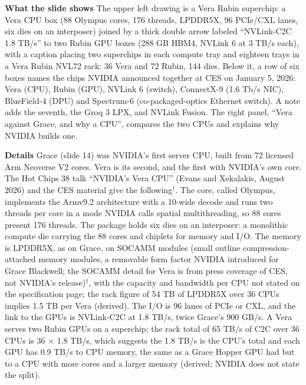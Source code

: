 \documentclass[11pt,letterpaper]{article}
\newcommand{\para}[1]{\medskip\noindent\textbf{#1}\quad}
\begin{document}
\para{What the slide shows} The upper left drawing is a Vera Rubin superchip: a Vera CPU box (88 Olympus cores, 176 threads, LPDDR5X, 96 PCIe/CXL lanes, six dies on an interposer) joined by a thick double arrow labeled ``NVLink-C2C 1.8 TB/s'' to two Rubin GPU boxes (288 GB HBM4, NVLink 6 at 3 TB/s each), with a caption placing two superchips in each compute tray and eighteen trays in a Vera Rubin NVL72 rack: 36 Vera and 72 Rubin, 144 dies. Below it, a row of six boxes names the chips NVIDIA announced together at CES on January 5, 2026: Vera (CPU), Rubin (GPU), NVLink 6 (switch), ConnectX-9 (1.6 Tb/s NIC), BlueField-4 (DPU) and Spectrum-6 (co-packaged-optics Ethernet switch). A note adds the seventh, the Groq 3 LPX, and NVLink Fusion. The right panel, ``Vera against Grace, and why a CPU'', compares the two CPUs and explains why NVIDIA builds one.

\para{Details} Grace (slide 14) was NVIDIA's first server CPU, built from 72 licensed Arm Neoverse V2 cores. Vera is its second, and the first with NVIDIA's own core. The Hot Chips 38 talk ``NVIDIA's Vera CPU'' (Evans and Xekalakis, August 2026) and the CES material give the following$^\dagger$. The core, called Olympus, implements the Armv9.2 architecture with a 10-wide decode and runs two threads per core in a mode NVIDIA calls spatial multithreading, so 88 cores present 176 threads. The package holds six dies on an interposer: a monolithic compute die carrying the 88 cores and chiplets for memory and I/O. The memory is LPDDR5X, as on Grace, on SOCAMM modules (small outline compression-attached memory modules, a removable form factor NVIDIA introduced for Grace Blackwell; the SOCAMM detail for Vera is from press coverage of CES, not NVIDIA's release)$^\dagger$, with the capacity and bandwidth per CPU not stated on the specification page; the rack figure of 54 TB of LPDDR5X over 36 CPUs implies 1.5 TB per Vera (derived). The I/O is 96 lanes of PCIe or CXL, and the link to the GPUs is NVLink-C2C at 1.8 TB/s, twice Grace's 900 GB/s. A Vera serves two Rubin GPUs on a superchip; the rack total of 65 TB/s of C2C over 36 CPUs is 36 $\times$ 1.8 TB/s, which suggests the 1.8 TB/s is the CPU's total and each GPU has 0.9 TB/s to CPU memory, the same as a Grace Hopper GPU had but to a CPU with more cores and a larger memory (derived; NVIDIA does not state the split).
\end{document}
